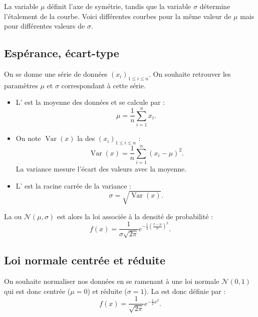 \documentclass[11pt,class=report,crop=false]{standalone}
\begin{document}
La variable $\mu$ définit l'axe de symétrie, tandis que la variable $\sigma$ détermine l'étalement de la courbe. Voici différentes courbes pour la même valeur de $\mu$ mais pour différentes valeurs de $\sigma$.





\subsection{Espérance, écart-type}

On se donne une série de données $(x_i)_{1\le i \le n}$. On souhaite retrouver les paramètres
$\mu$ et $\sigma$ correspondant à cette série.


\begin{itemize}
  \item L' est la moyenne des données et se calcule par :
$$\mu = \frac{1}{n} \sum_{i=1}^n x_i.$$

  \item On note $\operatorname{Var}(x)$ la  des $(x_i)_{1\le i \le n}$ :  
	$$\operatorname{Var}(x) = \frac{1}{n} \sum_{i=1}^{n}(x_i-\mu)^2.$$
	La variance mesure l'écart des valeurs avec la moyenne.
		
  \item L' est la racine carrée de la variance :
  $$\sigma = \sqrt{\operatorname{Var}(x)}.$$
\end{itemize}

La  ou  $\mathcal{N}(\mu,\sigma)$ est alors la loi associée à la densité de probabilité :
$$f(x) = \frac{1}{\sigma\sqrt{2\pi}} e^{-\frac12\left(\frac{x-\mu}{\sigma}\right)^2}.$$


\subsection{Loi normale centrée et réduite}

On souhaite normaliser nos données en se ramenant à une loi normale $\mathcal{N}(0,1)$ qui est donc centrée ($\mu=0$) et réduite ($\sigma=1$). 
La  est donc définie par :
$$f(x) = \frac{1}{\sqrt{2\pi}} e^{-\frac12 x^2}.$$
\end{document}
